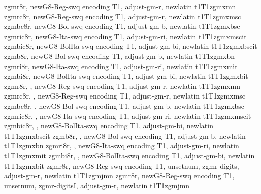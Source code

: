 \installfonts

%
{zgmr8r,%
newG8-Reg-swq encoding T1,%
adjust-gm-r,%
newlatin}
{t1}{T1}{zgmx}{m}{n}{}
%
{zgmrc8r,%
newG8-Reg-swq encoding T1,%
adjust-gm-r,%
newlatin}
{t1}{T1}{zgmx}{m}{sc}{}
%
{zgmbc8r,%
newG8-Bol-swq encoding T1,%
adjust-gm-b,%
newlatin}
{t1}{T1}{zgmx}{b}{sc}{}
%
{zgmric8r,%
newG8-Ita-swq encoding T1,%
adjust-gm-ri,%
newlatin}
{t1}{T1}{zgmx}{m}{scit}{}
%
{zgmbic8r,%
newG8-BolIta-swq encoding T1,%
adjust-gm-bi,%
newlatin}
{t1}{T1}{zgmx}{b}{scit}{}
%
{zgmb8r,%
newG8-Bol-swq encoding T1,%
adjust-gm-b,%
newlatin}
{t1}{T1}{zgmx}{b}{n}{}
%
{zgmri8r,%
newG8-Ita-swq encoding T1,%
adjust-gm-ri,%
newlatin}
{t1}{T1}{zgmx}{m}{it}{}
%
{zgmbi8r,%
newG8-BolIta-swq encoding T1,%
adjust-gm-bi,%
newlatin}
{t1}{T1}{zgmx}{b}{it}{}
%
{zgmr8r,%
\metrics {},%
newG8-Reg-swq encoding T1,%
adjust-gm-r,%
newlatin}
{t1}{T1}{zgmx}{m}{n}{}
%
{zgmrc8r,%
\metrics {},%
newG8-Reg-swq encoding T1,%
adjust-gm-r,%
newlatin}
{t1}{T1}{zgmx}{m}{sc}{}
%
{zgmbc8r,%
\metrics {},%
newG8-Bol-swq encoding T1,%
adjust-gm-b,%
newlatin}
{t1}{T1}{zgmx}{b}{sc}{}
%
{zgmric8r,%
\metrics {},%
newG8-Ita-swq encoding T1,%
adjust-gm-ri,%
newlatin}
{t1}{T1}{zgmx}{m}{scit}{}
%
{zgmbic8r,%
\metrics {},%
newG8-BolIta-swq encoding T1,%
adjust-gm-bi,%
newlatin}
{t1}{T1}{zgmx}{b}{scit}{}
%
{zgmb8r,%
\metrics {},%
newG8-Bol-swq encoding T1,%
adjust-gm-b,%
newlatin}
{t1}{T1}{zgmx}{b}{n}{}
%
{zgmri8r,%
\metrics {},%
newG8-Ita-swq encoding T1,%
adjust-gm-ri,%
newlatin}
{t1}{T1}{zgmx}{m}{it}{}
%
{zgmbi8r,%
\metrics {},%
newG8-BolIta-swq encoding T1,%
adjust-gm-bi,%
newlatin}
{t1}{T1}{zgmx}{b}{it}{}
%
{zgmr8r,%
newG8-Reg-swq encoding T1,%
unsetnum,%
zgmr-digits,%
adjust-gm-r,%
newlatin}
{t1}{T1}{zgmj}{m}{n}{}
%
{zgmr8r,%
newG8-Reg-swq encoding T1,%
unsetnum,%
zgmr-digitsI,%
adjust-gm-r,%
newlatin}
{t1}{T1}{zgmj}{m}{n}{}
%
